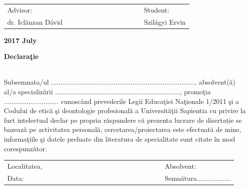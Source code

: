 \documentclass[12pt, a4paper, oneside]{book}
\theoremstyle{tetel}
\begin{document}
\vspace{2cm}
\begin{center}
\begin{tabular}{lcccccccccccl}
     Advisor: & & &&&& &&&&&& Student:\\
     dr. Iclănzan Dávid &&&&&& &&&&&& Szilágyi Ervin\\
\end{tabular}
\end{center}

\begin{center}
    \vspace{1cm}\textbf{2017 July}
\end{center}

\newpage
\thispagestyle{empty}
\begin{center}
	\textbf{Declaraţie}
\end{center}
\leavevmode
\\[2cm]
\indent
Subsemnata/ul ............................................................................, absolvent(ă) al/a specializării .................................................................., promoţia ............................. cunoscând prevederile Legii Educaţiei Naţionale 1/2011 şi a Codului de etică şi deontologie profesională a Universităţii Sapientia cu privire la furt intelectual declar pe propria răspundere că prezenta lucrare de disertație se bazează pe activitatea personală, cercetarea/proiectarea este efectuată de mine, informaţiile şi datele preluate din literatura de specialitate sunt citate în mod corespunzător.
\newline
\\[7cm]
\indent
\begin{tabular}{lcccccccccccccccccl}
	Localitatea, & & &&&& &&&&&&&&&&&& Absolvent:\\
	Data: &&&&&& &&&&&&&&&&&&Semnătura..................\\
\end{tabular}
\end{document}
